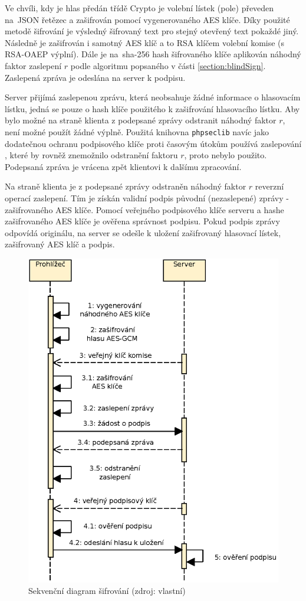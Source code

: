 Ve chvíli, kdy je hlas předán třídě Crypto je volební lístek (pole) převeden na~JSON řetězec a zašifrován pomocí vygenerovaného AES klíče. Díky použité metodě šifrování je výsledný šifrovaný text pro stejný otevřený text pokaždé jiný. Následně je zašifrován i samotný AES klíč a to RSA klíčem volební komise (s RSA-OAEP výplní). Dále je na~sha-256 hash šifrovaného klíče aplikován náhodný faktor zaslepení $r$ podle algoritmu popsaného v části \ref{section:blindSign}. Zaslepená zpráva je odeslána na server k podpisu.

Server přijímá zaslepenou zprávu, která neobsahuje žádné informace o hlasovacím lístku, jedná se pouze o hash klíče použitého k zašifrování hlasovacího lístku. Aby bylo možné na straně klienta z podepsané zprávy odstranit náhodný faktor $r$, není možné použít žádné výplně. Použitá knihovna \texttt{phpseclib} navíc jako dodatečnou ochranu podpisového klíče proti časovým útokům používá zaslepování \cite{phpseclibBlinding}, které by rovněž znemožnilo odstranění faktoru $r$, proto nebylo použito. Podepsaná zpráva je vrácena zpět klientovi k dalšímu zpracování.

Na straně klienta je z podepsané zprávy odstraněn náhodný faktor $r$ reverzní operací zaslepení. Tím je získán validní podpis původní (nezaslepené) zprávy - zašifrovaného AES klíče. Pomocí veřejného podpisového klíče serveru a hashe zašifrovaného AES klíče je ověřena správnost podpisu. Pokud podpis zprávy odpovídá originálu, na server se odešle k uložení zašifrovaný hlasovací lístek, zašifrovaný AES klíč a podpis.

\begin{figure}[h]
	\centering
	\includegraphics[width=0.8\linewidth]{svg/sifrovani.eps}
	\captionsetup{width=0.8\linewidth}
	\caption[Sekvenční diagram šifrování]{Sekvenční diagram šifrování (zdroj: vlastní)}
	\label{fig:diagramSifrovani}
\end{figure}

